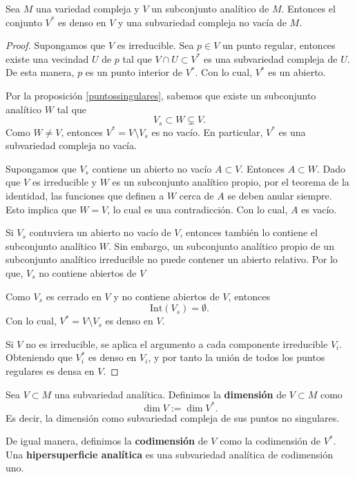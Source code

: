     \begin{corollary}
    	Sea $M$ una variedad compleja y $V$ un subconjunto analítico de $M$. Entonces el conjunto $V^*$ es denso en $V$ y una subvariedad compleja no vacía de $M$.
    \end{corollary}
    \begin{proof}
    	Supongamos que $V$ es irreducible. Sea $p\in V$ un punto regular, entonces existe una vecindad $U$ de $p$ tal que $V\cap U\subset V^*$ es una subvariedad compleja de $U$. De esta manera, $p$ es un punto interior de $V^*$. Con lo cual, $V^*$ es un abierto. 
    	
    	Por la proposición \ref{puntossingulares}, sabemos que existe un subconjunto analítico $W$ tal que
    	\begin{equation*}
    		V_s\subset W\subsetneq V.
    	\end{equation*}
    	Como $W\neq V$, entonces $V^*=V\setminus V_s$ es no vacío. En particular, $V^*$ es una subvariedad compleja no vacía.
    	
    	Supongamos que $V_s$ contiene un abierto no vacío $A\subset V$. Entonces $A\subset W$. Dado que $V$ es irreducible y $W$ es un subconjunto analítico propio, por el teorema de la identidad, las funciones que definen a $W$ cerca de $A$ se deben anular siempre. Esto implica que $W=V$, lo cual es una contradicción. Con lo cual, $A$ es vacío.
    	
    	Si $V_s$ contuviera un abierto no vacío de $V$, entonces también lo contiene el subconjunto analítico $W$. Sin embargo, un subconjunto analítico propio de un subconjunto analítico irreducible no puede contener un abierto relativo. Por lo que, $V_s$ no contiene abiertos de $V$
    	
    	Como $V_s$ es cerrado en $V$ y no contiene abiertos de $V$, entonces
    	\begin{equation*}
    		\mathrm{Int}(V_s)=\emptyset.
    	\end{equation*}
    	Con lo cual, $V^*=V\setminus V_s$ es denso en $V$.
    	
    	Si $V$ no es irreducible, se aplica el argumento a cada componente irreducible $V_i$. Obteniendo que $V_i^*$ es denso en $V_i$, y por tanto la unión de todos los puntos regulares es densa en $V$.
    \end{proof}
    
    \begin{definition}
    	Sea $V\subset M$ una subvariedad analítica. Definimos la \textbf{dimensión} de $V\subset M$ como
    	\begin{equation*}
    		\dim V:=\dim V^*.
    	\end{equation*}
    	Es decir, la dimensión como subvariedad compleja de sus puntos no singulares.
    	
    	De igual manera, definimos la \textbf{codimensión} de $V$ como la codimensión de $V^*$.
    	Una \textbf{hipersuperficie analítica} es una subvariedad analítica de codimensión uno.
    \end{definition}
    
